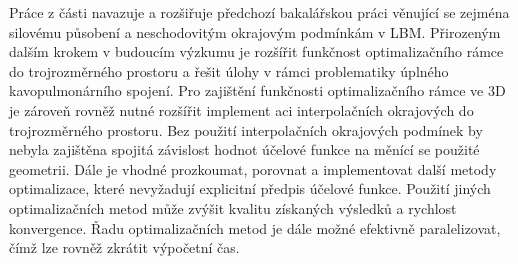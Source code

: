 Práce z části navazuje a rozšiřuje předchozí bakalářskou práci \cite{JB} věnující se zejména silovému působení a neschodovitým okrajovým podmínkám v LBM. Přirozeným dalším krokem v budoucím výzkumu je rozšířit funkčnost optimalizačního rámce do trojrozměrného prostoru a řešit úlohy v rámci problematiky úplného kavopulmonárního spojení. Pro zajištění funkčnosti optimalizačního rámce ve 3D je zároveň rovněž nutné rozšířit implement	aci interpolačních okrajových do trojrozměrného prostoru. Bez použití interpolačních okrajových podmínek by nebyla zajištěna spojitá závislost hodnot účelové funkce na měnící se použité geometrii. Dále je vhodné prozkoumat, porovnat a implementovat další metody optimalizace, které nevyžadují explicitní předpis účelové funkce. Použití jiných optimalizačních metod může zvýšit kvalitu získaných výsledků a rychlost konvergence. Řadu optimalizačních metod je dále možné efektivně paralelizovat, čímž lze rovněž zkrátit výpočetní čas.		